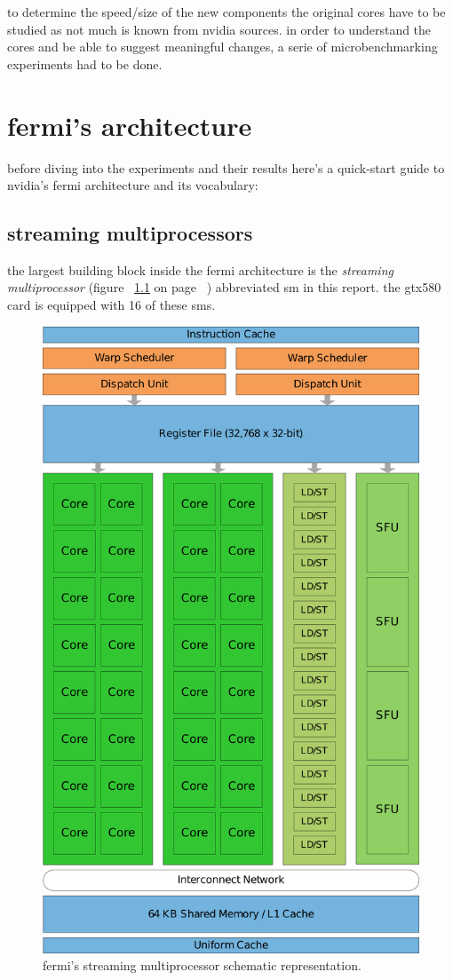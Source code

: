 \documentclass{report}
\begin{document}
    to determine the speed/size of the new components the original cores have to
    be studied as not much is known from nvidia sources. in order to understand 
    the cores and be able to suggest meaningful changes, a serie of microbenchmarking 
    experiments had to be done. 


\chapter{fermi's architecture}
    before diving into the experiments and their results here's a quick-start
    guide to nvidia's fermi architecture and its vocabulary:
    \section{streaming multiprocessors}
    the largest building block inside the fermi architecture is the 
    \emph{streaming multiprocessor} (figure ~\ref{fig:sm} on page 
    ~\pageref{fig:sm}) abbreviated sm in this report. the gtx580 card is equipped
    with 16 of these sms.
    \begin{figure}[h]
    \centering
        \includegraphics[width=0.75\linewidth]{pictures/fermi}
        \captionsetup{justification=centering}
        \caption{fermi's streaming multiprocessor schematic representation.\cite{fermiwhitepap}}
        \label{fig:sm}
    \end{figure}
\end{document}
